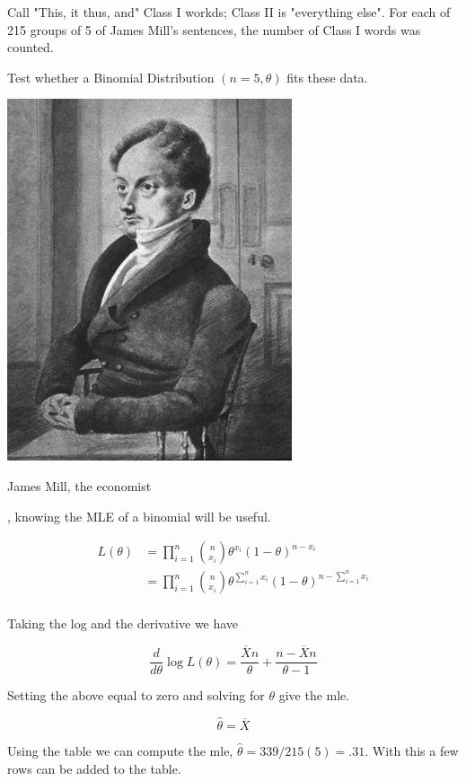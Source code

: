 \documentclass{tufte-book}
\theoremstyle{mytheoremstyle}
\theoremstyle{mylemstyle}
\theoremstyle{mydefstyle}
\begin{document}
Call "This, it thus, and" Class I workds; Class II is "everything else".   For each of 215 groups of 5 of James Mill's sentences, the number of Class I words was counted.

Test whether a Binomial Distribution $(n=5, \theta)$ fits these data.

\begin{marginfigure}
\includegraphics{James_Mill}
\caption{James Mill, the economist}
\end{marginfigure}

, knowing the MLE of a binomial will be useful.

\begin{align*}
L(\theta) &= \prod_{i=1}^n \binom{n}{x_i} \theta^{x_i}(1-\theta)^{n-x_i} \\
&= \prod_{i=1}^n \binom{n}{x_i} \theta^{\sum_{i=1}^n x_i}(1-\theta)^{n- \sum_{i=1}^n x_i}\\
\end{align*}

Taking the log and the derivative we have

\[ \frac{d}{d\theta} \log L(\theta) = \frac{\overline{X}n}{\theta} + \frac{n- \overline{X}n}{\theta - 1} \]

Setting the above equal to zero and solving for $\theta$ give the mle.

\[ \hat{\theta} = \overline{X} \]

Using the table we can compute the mle, $\hat{\theta} = 339/215(5) = .31$.  With this a few rows can be added to the table.
\end{document}
